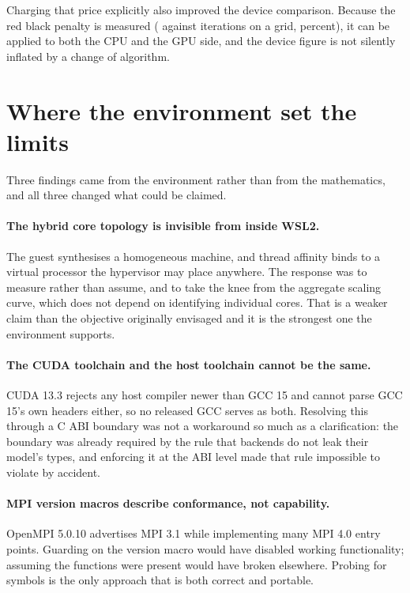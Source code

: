 Charging that price explicitly also improved the device comparison. Because the
red black penalty is measured (\pnlRedBlackIterations{} against
\pnlNaturalIterations{} iterations on a \pnlRedBlackGrid{} grid,
\pnlRedBlackPenalty{} percent), it can be applied to both the CPU and the GPU
side, and the device figure is not silently inflated by a change of algorithm.

\section{Where the environment set the limits}

Three findings came from the environment rather than from the mathematics, and
all three changed what could be claimed.

\paragraph{The hybrid core topology is invisible from inside WSL2.} The guest
synthesises a homogeneous machine, and thread affinity binds to a virtual
processor the hypervisor may place anywhere. The response was to measure rather
than assume, and to take the knee from the aggregate scaling curve, which does
not depend on identifying individual cores. That is a weaker claim than the
objective originally envisaged and it is the strongest one the environment
supports.

\paragraph{The CUDA toolchain and the host toolchain cannot be the same.}
CUDA 13.3 rejects any host compiler newer than GCC 15 and cannot parse GCC 15's
own headers either, so no released GCC serves as both. Resolving this through a
C ABI boundary was not a workaround so much as a clarification: the boundary was
already required by the rule that backends do not leak their model's types, and
enforcing it at the ABI level made that rule impossible to violate by accident.

\paragraph{MPI version macros describe conformance, not capability.} OpenMPI
5.0.10 advertises MPI 3.1 while implementing many MPI 4.0 entry points. Guarding
on the version macro would have disabled working functionality; assuming the
functions were present would have broken elsewhere. Probing for symbols is the
only approach that is both correct and portable.

